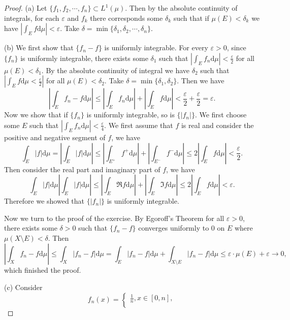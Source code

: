 \begin{proof}
(a) Let $\{f_1,f_2,\cdots,f_n\}\subset L^1(\mu)$. Then by the absolute continuity of integrals, for each $\varepsilon$ and $f_k$ there corresponds some $\delta_k$ such that if $\mu(E)<\delta_k$ we have $|\int_Ef\mathrm{d}\mu|<\varepsilon$. Take $\delta=\min\{\delta_1,\delta_2,\cdots,\delta_n\}$.\par
(b) We first show that $\{f_n-f\}$ is uniformly integrable. For every $\varepsilon>0$, since $\{f_n\}$ is uniformly integrable, there exists some $\delta_1$ such that $|\int_Ef_n\mathrm{d}\mu|<\frac{\varepsilon}{2}$ for all $\mu(E)<\delta_1$. By the absolute continuity of integral we have $\delta_2$ such that $|\int_Ef\mathrm{d}\mu<\frac{\varepsilon}{2}|$ for all $\mu(E)<\delta_2$. Take $\delta=\min\{\delta_1,\delta_2\}$. Then we have 
$$
\left| \int_E{f_n-f\mathrm{d}\mu} \right|\le \left| \int_E{f_n\mathrm{d}\mu} \right|+\left| \int_E{f\mathrm{d}\mu} \right|<\frac{\varepsilon}{2}+\frac{\varepsilon}{2}=\varepsilon .
$$
Now we show that if $\{f_n\}$ is uniformly integrable, so is $\{|f_n|\}$. We first choose some $E$ such that $|\int_Ef_n\mathrm{d}\mu|<\frac{\varepsilon}{4}$. We first assume that $f$ is real and consider the positive and negative segment of $f$, we have 
$$
\int_E{\left| f \right|\mathrm{d}\mu}=\left| \int_E{\left| f \right|\mathrm{d}\mu} \right|\le \left| \int_{E^+}{f^+\mathrm{d}\mu} \right|+\left| \int_{E^-}{f^-\mathrm{d}\mu} \right|\le 2\left| \int_E{f\mathrm{d}\mu} \right|<\frac{\varepsilon}{2}.
$$
Then consider the real part and imaginary part of $f$, we have 
$$
\int_E{\left| f \right|\mathrm{d}\mu}\left| \int_E{\left| f \right|\mathrm{d}\mu} \right|\le \left| \int_E{\Re f\mathrm{d}\mu} \right|+\left| \int_E{\Im f\mathrm{d}\mu} \right|\le 2\left| \int_E{f\mathrm{d}\mu} \right|<\varepsilon .
$$
Therefore we showed that $\{|f_n|\}$ is uniformly integrable.\par
Now we turn to the proof of the exercise. By Egoroff's Theorem for all $\varepsilon>0$, there exists some $\delta>0$ such that $\{f_n-f\}$ converges uniformly to $0$ on $E$ where $\mu(X\setminus E)<\delta$. Then 
$$
\left| \int_X{f_n-f\mathrm{d}\mu} \right|\le \int_X{\left| f_n-f \right|\mathrm{d}\mu}=\int_E{\left| f_n-f \right|\mathrm{d}\mu}+\int_{X\setminus E}{\left| f_n-f \right|\mathrm{d}\mu}\le \varepsilon \cdot \mu \left( E \right) +\varepsilon \rightarrow 0,
$$
which finished the proof.\par
(c) Consider 
$$
f_n\left( x \right) =\begin{cases}
	\frac{1}{n},x\in \left[ 0,n \right] ,\\

\end{cases}$$
\end{proof}
